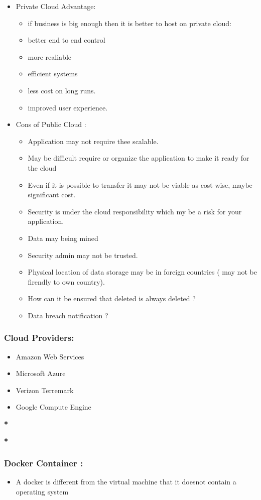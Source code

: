 \documentclass[11pt]{article}
\begin{document}
\begin{itemize}
\item Private Cloud Advantage:
\begin{itemize}
\item if business is big enough then it is better to host on private cloud:
\item better end to end control
\item more realiable
\item efficient systems
\item less cost on long runs.
\item improved user experience.
\end{itemize}

\item Cons of Public Cloud :
\begin{itemize}
\item Application may not require thee scalable.
\item May be difficult  require or organize the application to make it ready for
the cloud
\item Even if it is possible to transfer it may not be viable as cost wise, maybe
significant cost.
\item Security is under the cloud responsibility which my be a risk for your
application.
\item Data may being mined
\item Security admin may not be trusted.
\item Physical location of data storage may be in foreign countries ( may not be
firendly to own country).
\item How can it be ensured that deleted is always deleted ?
\item Data breach notification ?
\end{itemize}
\end{itemize}

\subsubsection{Cloud Providers:}
\label{sec:orgc407e19}
\begin{itemize}
\item Amazon Web Services
\item Microsoft Azure
\item Verizon Terremark
\item Google Compute Engine
\end{itemize}

\textbf{*}

\textbf{*}

\subsubsection{Docker Container :}
\label{sec:org5d682d0}
\begin{itemize}
\item A docker is different from the virtual machine that it doesnot contain a
operating system
\end{itemize}

\subsubsection{}
\label{sec:org4e9dad5}
\end{document}
